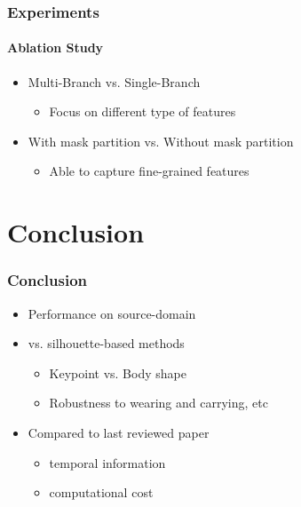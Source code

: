 \documentclass[
	12pt, %
	aspectratio=169, %
]{beamer}
\begin{document}
\begin{frame}
	\frametitle{Experiments}
	\framesubtitle{Ablation Study}

	\begin{itemize}
		\item Multi-Branch vs. Single-Branch
		\begin{itemize}
			\item Focus on different type of features
		\end{itemize}
		\item With mask partition vs. Without mask partition
		\begin{itemize}
			\item Able to capture fine-grained features
		\end{itemize}
	\end{itemize}
\end{frame}


\section{Conclusion}

\begin{frame}
	\frametitle{Conclusion}

	\begin{itemize}
		\item Performance on source-domain
		\item vs. silhouette-based methods
		\begin{itemize}
			\item Keypoint vs. Body shape
			\item Robustness to wearing and carrying, etc
		\end{itemize}
		\item Compared to last reviewed paper
		\begin{itemize}
			\item temporal information
			\item computational cost
		\end{itemize}
	\end{itemize}
\end{frame}


\end{document}
